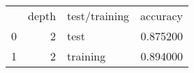 \begin{tabular}{lrlr}
 & depth & test/training & accuracy \\
0 & 2 & test & 0.875200 \\
1 & 2 & training & 0.894000 \\
\end{tabular}

